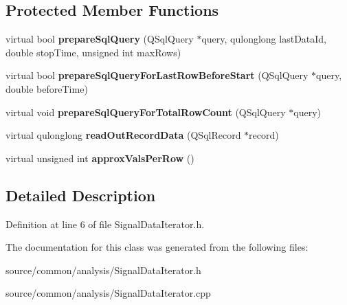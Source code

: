 \subsection*{Protected Member Functions}
\begin{DoxyCompactItemize}
\item 
\hypertarget{class_picto_1_1_signal_data_iterator_ab5bc56789cfe9405c4035877dd6e25c5}{virtual bool {\bfseries prepare\-Sql\-Query} (Q\-Sql\-Query $\ast$query, qulonglong last\-Data\-Id, double stop\-Time, unsigned int max\-Rows)}\label{class_picto_1_1_signal_data_iterator_ab5bc56789cfe9405c4035877dd6e25c5}

\item 
\hypertarget{class_picto_1_1_signal_data_iterator_ac0aedd09d2a8eaf73956f746c9fb120d}{virtual bool {\bfseries prepare\-Sql\-Query\-For\-Last\-Row\-Before\-Start} (Q\-Sql\-Query $\ast$query, double before\-Time)}\label{class_picto_1_1_signal_data_iterator_ac0aedd09d2a8eaf73956f746c9fb120d}

\item 
\hypertarget{class_picto_1_1_signal_data_iterator_af49681c3481df895806bfd3960aa92df}{virtual void {\bfseries prepare\-Sql\-Query\-For\-Total\-Row\-Count} (Q\-Sql\-Query $\ast$query)}\label{class_picto_1_1_signal_data_iterator_af49681c3481df895806bfd3960aa92df}

\item 
\hypertarget{class_picto_1_1_signal_data_iterator_a662a0b212d009a46c5d2b8294bf9c2ee}{virtual qulonglong {\bfseries read\-Out\-Record\-Data} (Q\-Sql\-Record $\ast$record)}\label{class_picto_1_1_signal_data_iterator_a662a0b212d009a46c5d2b8294bf9c2ee}

\item 
\hypertarget{class_picto_1_1_signal_data_iterator_a6067d3de80b49257e2138dd533c7fd7d}{virtual unsigned int {\bfseries approx\-Vals\-Per\-Row} ()}\label{class_picto_1_1_signal_data_iterator_a6067d3de80b49257e2138dd533c7fd7d}

\end{DoxyCompactItemize}


\subsection{Detailed Description}


Definition at line 6 of file Signal\-Data\-Iterator.\-h.



The documentation for this class was generated from the following files\-:\begin{DoxyCompactItemize}
\item 
source/common/analysis/Signal\-Data\-Iterator.\-h\item 
source/common/analysis/Signal\-Data\-Iterator.\-cpp\end{DoxyCompactItemize}
